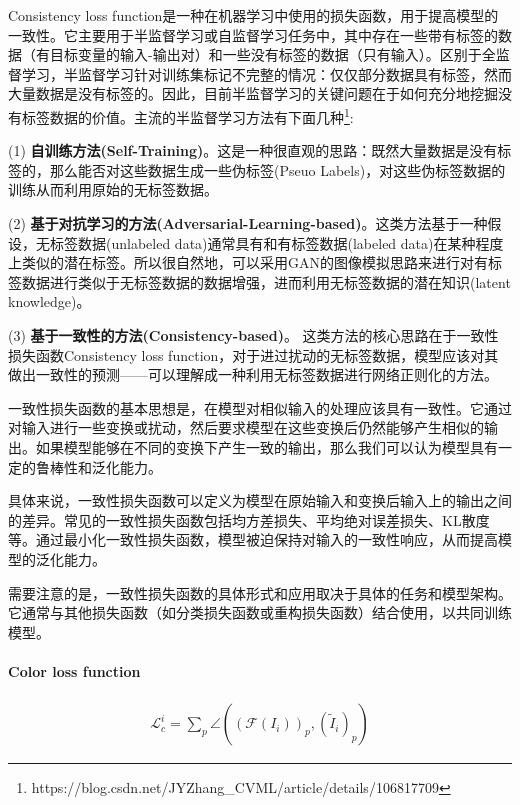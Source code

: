 \documentclass[letterpaper,12pt]{article}
\begin{document}
	Consistency loss function是一种在机器学习中使用的损失函数，用于提高模型的一致性。它主要用于半监督学习或自监督学习任务中，其中存在一些带有标签的数据（有目标变量的输入-输出对）和一些没有标签的数据（只有输入）。区别于全监督学习，半监督学习针对训练集标记不完整的情况：仅仅部分数据具有标签，然而大量数据是没有标签的。因此，目前半监督学习的关键问题在于如何充分地挖掘没有标签数据的价值。主流的半监督学习方法有下面几种\footnote{https://blog.csdn.net/JYZhang\_CVML/article/details/106817709}:
	
	(1) \textbf{自训练方法(Self-Training)}。这是一种很直观的思路：既然大量数据是没有标签的，那么能否对这些数据生成一些伪标签(Pseuo Labels)，对这些伪标签数据的训练从而利用原始的无标签数据。
	
	(2) \textbf{基于对抗学习的方法(Adversarial-Learning-based)}。这类方法基于一种假设，无标签数据(unlabeled data)通常具有和有标签数据(labeled data)在某种程度上类似的潜在标签。所以很自然地，可以采用GAN的图像模拟思路来进行对有标签数据进行类似于无标签数据的数据增强，进而利用无标签数据的潜在知识(latent knowledge)。
	
	(3) \textbf{基于一致性的方法(Consistency-based)}。 这类方法的核心思路在于一致性损失函数Consistency loss function，对于进过扰动的无标签数据，模型应该对其做出一致性的预测——可以理解成一种利用无标签数据进行网络正则化的方法。
	
	一致性损失函数的基本思想是，在模型对相似输入的处理应该具有一致性。它通过对输入进行一些变换或扰动，然后要求模型在这些变换后仍然能够产生相似的输出。如果模型能够在不同的变换下产生一致的输出，那么我们可以认为模型具有一定的鲁棒性和泛化能力。
	
	具体来说，一致性损失函数可以定义为模型在原始输入和变换后输入上的输出之间的差异。常见的一致性损失函数包括均方差损失、平均绝对误差损失、KL散度等。通过最小化一致性损失函数，模型被迫保持对输入的一致性响应，从而提高模型的泛化能力。
	
	需要注意的是，一致性损失函数的具体形式和应用取决于具体的任务和模型架构。它通常与其他损失函数（如分类损失函数或重构损失函数）结合使用，以共同训练模型。
	
	\paragraph{Color loss function}
	
	\begin{equation}
		\begin{aligned}
			\mathcal{L}_c^{i} = \sum_{p} \angle \left( (\mathcal{F}(I_i))_{p}, (\tilde{I}_i)_p \right)
		\end{aligned}
		\label{eq: color loss}
	\end{equation}
	
\end{document}

